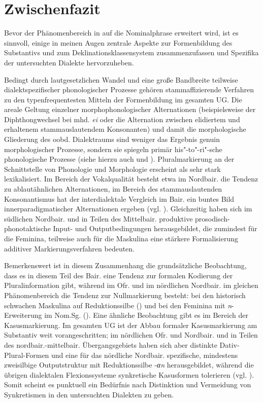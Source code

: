 \section{Zwischenfazit}
\label{sec:8.4}
Bevor der Phänomenbereich in  auf die Nominalphrase erweitert wird, ist es sinnvoll, einige in meinen Augen zentrale Aspekte zur Formenbildung des Substantivs und zum Deklinationsklassensystem zusammenzufassen und Spezifika der untersuchten Dialekte hervorzuheben.

Bedingt durch lautgesetzlichen Wandel und eine große Bandbreite teilweise dialektspezifischer phonologischer Prozesse gehören stammaffizierende Verfahren zu den typenfrequentesten Mitteln der Formenbildung im gesamten UG. Die areale Geltung einzelner morphophonologischer Alternationen (beispielsweise der Diphthongwechsel bei mhd. \textit{ei} oder die Alternation zwischen elidiertem und erhaltenem stammauslautendem Konsonanten) und damit die morphologische Gliederung des oobd. Dialektraums sind weniger das Ergebnis genuin morphologischer Prozesse, sondern sie spiegeln primär his"-to"-ri"-sche phonologische Prozesse (siehe hierzu auch \citealt[382]{Harnisch2019} und \citealt[171--172]{Rowley1997}). Pluralmarkierung an der Schnittstelle von Phonologie und Morphologie erscheint als sehr stark lexikalisiert. Im Bereich der Vokalqualität besteht etwa im Nordbair. die Tendenz zu ablautähnlichen Alternationen, im Bereich des stammauslautenden Konsonantismus hat der interdialektale Vergleich im Bair. ein buntes Bild innerparadigmatischer Alternationen ergeben (vgl. ). Gleichzeitig haben sich im südlichen Nordbair. und in Teilen des Mittelbair. produktive prosodisch-phonotaktische Input- und Outputbedingungen herausgebildet, die zumindest für die Feminina, teilweise auch für die Maskulina eine stärkere Formalisierung additiver Markierungsverfahren bedeuten.

Bemerkenswert ist in diesem Zusammenhang die grundsätzliche Beobachtung, dass es in diesem Teil des Bair. eine Tendenz zur formalen Kodierung der Pluralinformation gibt, während im Ofr. und im nördlichen Nordbair. im gleichen Phänomenbereich die Tendenz zur Nullmarkierung besteht: bei den historisch schwachen Maskulina auf Reduktionssilbe () und bei den Feminina mit \textit{n}{}-Erweiterung im Nom.Sg. (). Eine ähnliche Beobachtung gibt es im Bereich der Kasusmarkierung. Im gesamten UG ist der Abbau formaler Kasusmarkierung am Substantiv weit vorangeschritten; im nördlichen Ofr. und Nordbair. und in Teilen des nordbair.-mittelbair. Übergangsgebiets haben sich aber distinkte Dativ-Plural-Formen und eine für das nördliche Nordbair. spezifische, mindestens zweisilbige Outputstruktur mit Reduktionssilbe {}-\textit{αn} herausgebildet, während die übrigen dialektalen Flexionssysteme synkretische Kasusformen tolerieren (vgl. ). Somit scheint es punktuell ein Bedürfnis nach Distinktion und Vermeidung von Synkretismen in den untersuchten Dialekten zu geben.

